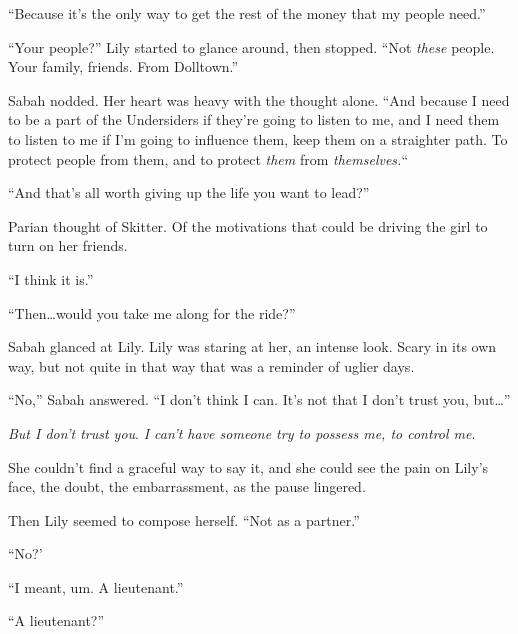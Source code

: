 ``Because it's the only way to get the rest of the money that my people need.''



``Your people?''  Lily started to glance around, then stopped.  ``Not \emph{these} people.  Your family, friends.  From Dolltown.''



Sabah nodded.  Her heart was heavy with the thought alone.  ``And because I need to be a part of the Undersiders if they're going to listen to me, and I need them to listen to me if I'm going to influence them, keep them on a straighter path.  To protect people from them, and to protect \emph{them} from \emph{themselves.}``



``And that's all worth giving up the life you want to lead?''



Parian thought of Skitter.  Of the motivations that could be driving the girl to turn on her friends.



``I think it is.''



``Then\ldots would you take me along for the ride?''



Sabah glanced at Lily.  Lily was staring at her, an intense look.  Scary in its own way, but not quite in that way that was a reminder of uglier days.



``No,'' Sabah answered.  ``I don't think I can.  It's not that I don't trust you, but\ldots''



\emph{But I don't trust you}.  \emph{I can't have someone try to possess me, to control me}.



She couldn't find a graceful way to say it, and she could see the pain on Lily's face, the doubt, the embarrassment, as the pause lingered.



Then Lily seemed to compose herself.  ``Not as a partner.''



``No?'



``I meant, um.  A lieutenant.''



``A lieutenant?''



